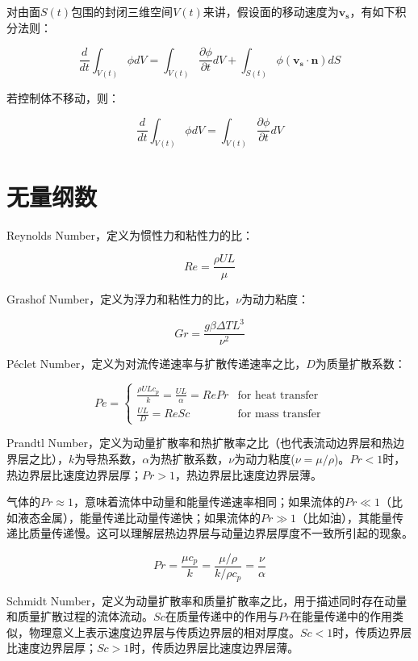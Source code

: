 对由面$ S(t) $包围的封闭三维空间$ V(t) $来讲，假设面的移动速度为$ \mathbf{v_s} $，有如下积分法则：

\begin{equation}
    \frac{d}{dt} \int_{V(t)} \phi dV = \int_{V(t)} \frac{\partial \phi}{\partial t} dV + \int_{S(t)} \phi(\mathbf{v_s}\cdot \mathbf{n}) dS
\end{equation}

若控制体不移动，则：

\begin{equation}\label{Leibniz}
\frac{d}{dt} \int_{V(t)} \phi dV = \int_{V(t)} \frac{\partial \phi}{\partial t} dV
\end{equation}


\section{无量纲数}\label{dimensionless-number}

Reynolds Number，定义为惯性力和粘性力的比：

\[ Re = \frac{\rho UL}{\mu} \]

Grashof Number，定义为浮力和粘性力的比，$ \nu $为动力粘度：

\[ Gr = \frac{g\beta\Delta TL^3}{\nu^2} \]

P\'{e}clet Number，定义为对流传递速率与扩散传递速率之比，$ D $为质量扩散系数：

\[ Pe =
\begin{cases}
\frac{\rho ULc_p}{k} = \frac{UL}{\alpha} = RePr & \text{for heat transfer}\\
\frac{UL}{D} = ReSc & \text{for mass transfer}
\end{cases}
\]

Prandtl Number，定义为动量扩散率和热扩散率之比（也代表流动边界层和热边界层之比），$ k $为导热系数，$ \alpha $为热扩散系数，$ \nu $为动力粘度($ \nu = \mu/\rho $)。$ Pr<1 $时，热边界层比速度边界层厚；$ Pr>1 $，热边界层比速度边界层薄。

气体的$ Pr\approx 1 $，意味着流体中动量和能量传递速率相同；如果流体的$ Pr\ll 1 $（比如液态金属），能量传递比动量传递快；如果流体的$ Pr \gg 1 $（比如油），其能量传递比质量传递慢。这可以理解层热边界层与动量边界层厚度不一致所引起的现象。

\[ Pr = \frac{\mu c_p}{k} = \frac{\mu/\rho}{k/\rho c_p} = \frac{\nu}{\alpha} \]

Schmidt Number，定义为动量扩散率和质量扩散率之比，用于描述同时存在动量和质量扩散过程的流体流动。$ Sc $在质量传递中的作用与$ Pr $在能量传递中的作用类似，物理意义上表示速度边界层与传质边界层的相对厚度。$ Sc<1 $时，传质边界层比速度边界层厚；$ Sc>1 $时，传质边界层比速度边界层薄。

